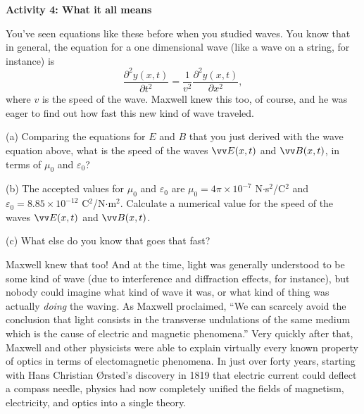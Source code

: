 \textbf{Activity 4: What it all means}

You've seen equations like these before when you studied waves.  You know that in general, the equation for a one dimensional wave (like a wave on a string, for instance) is
\begin{displaymath}
\frac{\partial^2y(x,t)}{\partial t^2}= \frac{1}{v^2} \frac{\partial^2y(x,t)}{\partial x^2},
\end{displaymath}
where $v$ is the speed of the wave.  Maxwell knew this too, of course, and he was eager to find out how fast this new kind of wave traveled.

(a) Comparing the equations for $E$ and $B$ that you just derived with the wave equation above, what is the speed of the waves $\vv E(x,t)$ and $\vv B(x,t)$, in terms of $\mu_0$ and $\varepsilon_0$?
\vspace{0.5in}

(b)  The accepted values for $\mu_0$ and $\varepsilon_0$ are $\mu_0=4\pi \times 10^{-7}$ N$\cdot$s$^2$/C$^2$ and 
$\varepsilon_0=8.85 \times 10^{-12}$ C$^2$/N$\cdot $m$^2$.  Calculate a numerical value for the speed of the waves 
$\vv E(x,t)$ and $\vv B(x,t)$.
\vspace{0.5in}

(c) What else do you know that goes that fast?
\vspace{0.5in}

Maxwell knew that too!  And at the time, light was generally understood to be some kind of wave (due to interference and diffraction effects, for instance), but nobody could imagine what kind of wave it was, or what kind of thing was actually \textit{doing} the waving.  As Maxwell proclaimed, ``We can scarcely avoid the conclusion that light consists in the transverse undulations of the same medium which is the cause of electric and magnetic phenomena.''  Very quickly after that, Maxwell and other physicists were able to explain virtually every known property of optics in terms of electomagnetic phenomena.  In just over forty years, starting with  Hans Christian \O rsted's discovery in 1819 that electric current could deflect a compass needle, physics had now completely unified the fields of magnetism, electricity, and optics into a single theory.  





